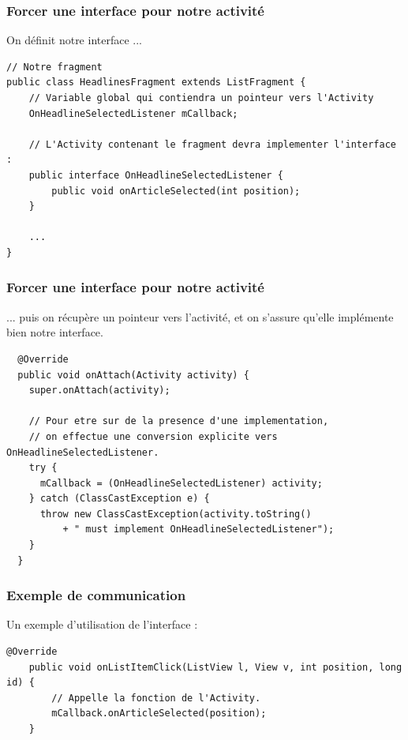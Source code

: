 \documentclass{beamer}
\begin{document}
\begin{frame}[fragile]
\frametitle{Forcer une interface pour notre activité}
\begin{block}{On définit notre interface ...}
\begin{lstlisting}
// Notre fragment
public class HeadlinesFragment extends ListFragment {
	// Variable global qui contiendra un pointeur vers l'Activity
    OnHeadlineSelectedListener mCallback;

    // L'Activity contenant le fragment devra implementer l'interface :
    public interface OnHeadlineSelectedListener {
        public void onArticleSelected(int position);
    }
    
    ...
}
\end{lstlisting}
\end{block}
\end{frame}


\begin{frame}[fragile]
\frametitle{Forcer une interface pour notre activité}
\begin{block}{... puis on récupère un pointeur vers l'activité, et on s'assure qu'elle implémente bien notre interface.}
\begin{lstlisting}
  @Override
  public void onAttach(Activity activity) {
    super.onAttach(activity);
        
    // Pour etre sur de la presence d'une implementation,
    // on effectue une conversion explicite vers OnHeadlineSelectedListener.
    try {
      mCallback = (OnHeadlineSelectedListener) activity;
    } catch (ClassCastException e) {
      throw new ClassCastException(activity.toString()
          + " must implement OnHeadlineSelectedListener");
    }
  }
\end{lstlisting}
\end{block}
\end{frame}
    
\begin{frame}[fragile]
\frametitle{Exemple de communication}
\begin{exampleblock}{Un exemple d'utilisation de l'interface :}
\begin{lstlisting}
@Override
    public void onListItemClick(ListView l, View v, int position, long id) {
        // Appelle la fonction de l'Activity.
        mCallback.onArticleSelected(position);
    }
\end{lstlisting}
\end{exampleblock}
\end{frame}
\end{document}
